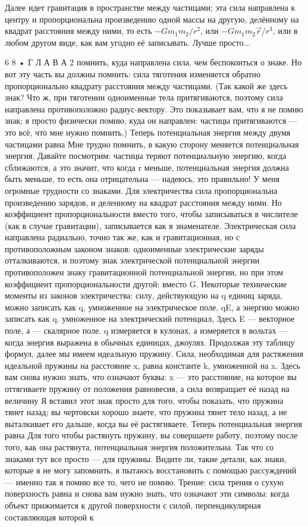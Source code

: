 \documentclass[10pt,oneside]{article}
\begin{document}
Далее идет гравитация в пространстве между частицами; эта сила направлена к центру и пропорциональна произведению одной массы на другую, делённому на квадрат расстояния между ними, то есть \(-Gm_1m_2/r^2\), или \(-Gm_1m_2\vec{r}/r^3\), или в любом другом виде, как вам угодно её записывать. Лучше просто...\par

6 8 • Г Л А В А  2 помнить, куда направлена сила, чем беспокоиться о знаке. Но вот эту часть вы должны помнить: сила тяготения изменяется обратно пропорционально квадрату расстояния между частицами. (Так какой же здесь знак? Что ж, при тяготении одноименные тела притягиваются, поэтому сила направлена противоположно радиус-вектору. Это показывает вам, что я не помню знак; я просто физически помню, куда он направлен: частицы притягиваются --- это всё, что мне нужно помнить.) Теперь потенциальная энергия между двумя частицами равна Мне трудно помнить, в какую сторону меняется потенциальная энергия. Давайте посмотрим: частицы теряют потенциальную энергию, когда сближаются, а это значит, что когда r меньше, потенциальная энергия должна быть меньше, то есть она отрицательна --- надеюсь, это правильно! У меня огромные трудности со знаками. Для электричества сила пропорциональна произведению зарядов, и деленному на квадрат расстояния между ними. Но коэффициент пропорциональности вместо того, чтобы записываться в числителе (как в случае гравитации), записывается как в знаменателе. Электрическая сила направлена радиально, точно так же, как и гравитационная, но с противоположным законом знаков: одноименные электрические заряды отталкиваются, и поэтому знак электрической потенциальной энергии противоположен знаку гравитационной потенциальной энергии, но при этом коэффициент пропорциональности другой: вместо G. Некоторые технические моменты из законов электричества: силу, действующую на q единиц заряда, можно записать как q, умноженное на электрическое поле, qE, а энергию можно записать как q, умноженное на электрический потенциал, Здесь E --- векторное поле, а --- скалярное поле. q измеряется в кулонах, а измеряется в вольтах --- когда энергия выражена в обычных единицах, джоулях. Продолжая эту таблицу формул, далее мы имеем идеальную пружину. Сила, необходимая для растяжения идеальной пружины на расстояние x, равна константе k, умноженной на x. Здесь вам снова нужно знать, что означают буквы: x --- это расстояние, на которое вы оттягиваете пружину от положения равновесия, а сила возвращает её назад на величину Я вставил этот знак просто для того, чтобы показать, что пружина тянет назад; вы чертовски хорошо знаете, что пружина тянет тело назад, а не выталкивает его дальше, когда вы её растягиваете. Теперь потенциальная энергия равна Для того чтобы растянуть пружину, вы совершаете работу, поэтому после того, как она растянута, потенциальная энергия положительна. Так что со знаками тут все просто --- для пружины. Видите ли, такие детали, как знаки, которые я не могу запомнить, я пытаюсь восстановить с помощью рассуждений --- именно так я помню все то, чего не помню. Трение: сила трения о сухую поверхность равна и снова вам нужно знать, что означают эти символы: когда объект прижимается к другой поверхности с силой, перпендикулярная составляющая которой к 
\end{document}
